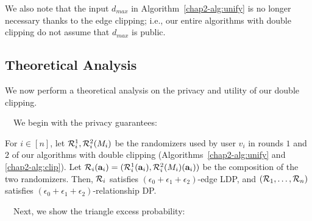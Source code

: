 We also note that the input $d_{max}$ in Algorithm~\ref{chap2-alg:unify} is no longer necessary thanks to the edge clipping; i.e., our entire algorithms with double clipping do not assume that $d_{max}$ is public. 

\subsection{Theoretical Analysis}
\label{chap2-sub:clip_theoretical_analysis}
We now perform a theoretical analysis on the privacy and utility of our double clipping. 

\smallskip
{}~~We begin with the privacy guarantees:
\begin{theorem}\label{chap2-thm:privacy_DC}
  For $i \in [n]$, 
  let $\mathcal{R}_i^1, \mathcal{R}_i^2(M_i)$ be the randomizers used by user $v_i$ in
  rounds $1$ and $2$ of our algorithms with double clipping (Algorithms~\ref{chap2-alg:unify} and \ref{chap2-alg:clip}). 
  Let $\mathcal{R}_i(\mathbf{a}_i) = (\mathcal{R}_i^1(\mathbf{a}_i), \mathcal{R}_i^2(M_i)(\mathbf{a}_i))$ 
  be the composition of the two randomizers. 
  Then,
  $\mathcal{R}_i$ satisfies $(\epsilon_0 + \epsilon_1 + \epsilon_2)$-edge LDP, 
  and $(\mathcal{R}_1,
  \ldots, \mathcal{R}_n)$ satisfies $(\epsilon_0 + \epsilon_1 + \epsilon_2)$-relationship DP.
\end{theorem}

\smallskip
{}~~Next, we show the triangle excess probability: 

